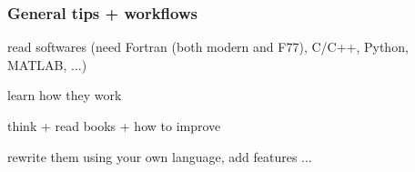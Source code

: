 \documentclass[english,9pt]{beamer}
\begin{document}
\begin{frame}
\frametitle{General tips + workflows}

read softwares (need Fortran (both modern and F77), C/C++, Python, MATLAB, ...)

learn how they work

think + read books + how to improve

rewrite them using your own language, add features ...

\end{frame}
\end{document}
